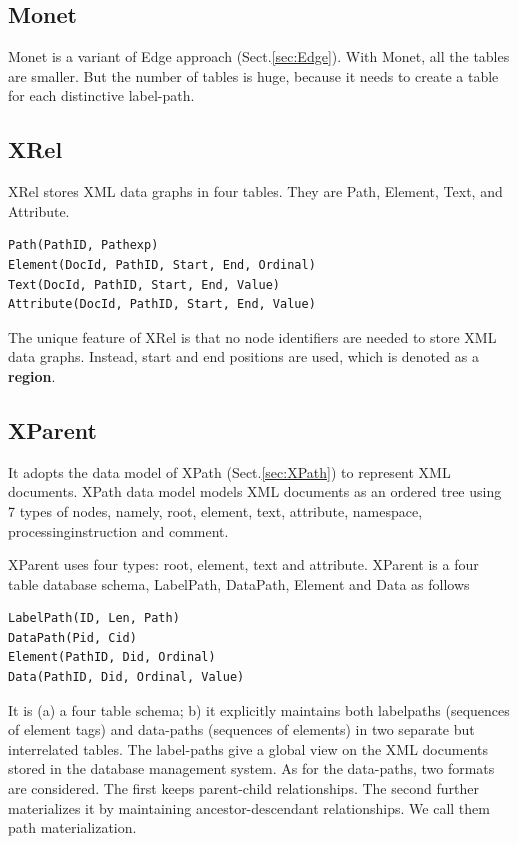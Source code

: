\subsection{Monet}
\label{sec:Monet}

Monet is a variant of Edge approach (Sect.\ref{sec:Edge}).
With Monet, all the tables are smaller. But the number of tables is huge,
because it needs to create a table for each distinctive label-path.

\subsection{XRel}
\label{sec:XRel}

XRel stores XML data graphs in four tables. They are Path, Element, Text, and
Attribute.
\begin{verbatim}
Path(PathID, Pathexp)
Element(DocId, PathID, Start, End, Ordinal)
Text(DocId, PathID, Start, End, Value)
Attribute(DocId, PathID, Start, End, Value)
\end{verbatim}
The unique feature of XRel is that no node identifiers
are needed to store XML data graphs. Instead, start
and end positions are used, which is denoted as a {\bf region}.


\subsection{XParent}
\label{sec:XParent}

It adopts the data model of XPath (Sect.\ref{sec:XPath}) to represent
XML documents.
XPath data model models XML documents as an
ordered tree using 7 types of nodes, namely, root,
element, text, attribute, namespace, processinginstruction
and comment.

XParent uses four types: root, element, text and attribute.
XParent is a four table database schema, LabelPath, DataPath, Element and Data
as follows
\begin{verbatim}
LabelPath(ID, Len, Path)
DataPath(Pid, Cid)
Element(PathID, Did, Ordinal)
Data(PathID, Did, Ordinal, Value)

\end{verbatim}

It is (a) a four table schema; b) it explicitly maintains both labelpaths
(sequences of element tags) and data-paths (sequences of elements) in two separate but
interrelated tables. The label-paths give a global view on the XML documents
stored in the database management system. As for the data-paths, two formats are
considered. The first keeps parent-child relationships.
The second further materializes it by maintaining ancestor-descendant
relationships. We call them path materialization.

